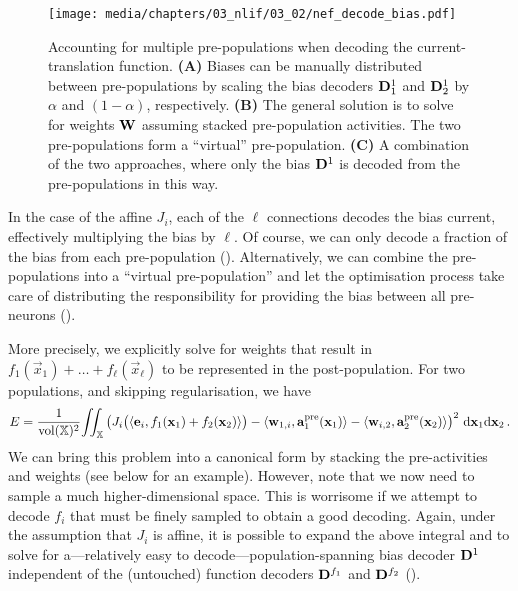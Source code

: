 \begin{figure}
	\texttt{[image: media/chapters/03\_nlif/03\_02/nef\_decode\_bias.pdf]}%
	{\label{fig:nef_decode_bias_a}}%
	{\label{fig:nef_decode_bias_b}}%
	{\label{fig:nef_decode_bias_c}}%
	\caption[Accounting for multiple pre-populations when decoding the current-translation function]{Accounting for multiple pre-populations when decoding the current-translation function. \textbf{(A)} Biases can be manually distributed between pre-populations by scaling the bias decoders $\mathbf{D}^1_1$ and $\mathbf{D}^1_2$ by $\alpha$ and $(1 - \alpha)$, respectively. \textbf{(B)} The general solution is to solve for weights $\mathbf{W}$ assuming stacked pre-population activities. The two pre-populations form a \enquote{virtual} pre-population. \textbf{(C)} A combination of the two approaches, where only the bias $\mathbf{D}^1$ is decoded from the pre-populations in this way.}
\end{figure}

In the case of the affine $J_i$, each of the $\ell$ connections decodes the bias current, effectively multiplying the bias by $\ell$.
Of course, we can only decode a fraction of the bias from each pre-population ().
Alternatively, we can combine the pre-populations into a \enquote{virtual pre-population} and let the optimisation process take care of distributing the responsibility for providing the bias between all pre-neurons ().

More precisely, we explicitly solve for weights that result in $f_1(\vec x_1) + \ldots + f_\ell(\vec x_\ell)$ to be represented in the post-population.
For two populations, and skipping regularisation, we have
\begin{align}
	E =
	\frac{1}{\operatorname{vol}(\mathbb{X})^2} \! \iint_{\mathbb{X}}
	\left(
		J_i\bigl(\langle \mathbf{e}_i, f_1(\mathbf{x}_1) + f_2(\mathbf{x}_2) \rangle\bigr)
		- \langle \mathbf{w}_{1, i}, \mathbf{a}_1^\mathrm{pre}(\mathbf{x}_1) \rangle
		- \langle \mathbf{w}_{i, 2}, \mathbf{a}_2^\mathrm{pre}(\mathbf{x}_2) \rangle
	\right)^2 \, \mathrm{d}\mathbf{x}_1 \mathrm{d}\mathbf{x}_2 \,.
	\label{eqn:decode_current_additive}
\end{align}
We can bring this problem into a canonical form by stacking the pre-activities and weights (see below for an example).
However, note that we now need to sample a much higher-dimensional space.
This is worrisome if we attempt to decode $f_i$ that must be finely sampled to obtain a good decoding.
Again, under the assumption that $J_i$ is affine, it is possible to expand the above integral and to solve for a---relatively easy to decode---population-spanning bias decoder $\mathbf{D}^1$ independent of the (untouched) function decoders $\mathbf{D}^{f_1}$ and $\mathbf{D}^{f_2}$ ().

